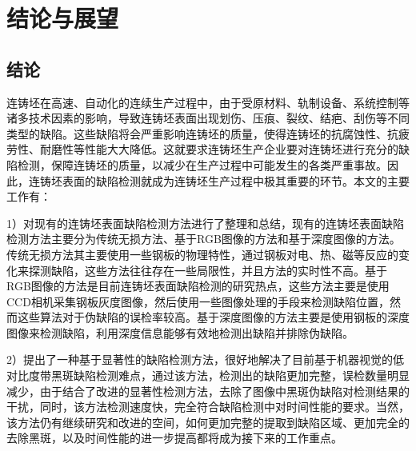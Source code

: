 ﻿%
%
%
%
%
%
\chapter{结论与展望}
    \section{结论}
    连铸坯在高速、自动化的连续生产过程中，由于受原材料、轨制设备、系统控制等诸多技术因素的影响，导致连铸坯表面出现划伤、压痕、裂纹、结疤、刮伤等不同类型的缺陷。这些缺陷将会严重影响连铸坯的质量，使得连铸坯的抗腐蚀性、抗疲劳性、耐磨性等性能大大降低。这就要求连铸坯生产企业要对连铸坯进行充分的缺陷检测，保障连铸坯的质量，以减少在生产过程中可能发生的各类严重事故。因此，连铸坯表面的缺陷检测就成为连铸坯生产过程中极其重要的环节。本文的主要工作有：

    1）对现有的连铸坯表面缺陷检测方法进行了整理和总结，现有的连铸坯表面缺陷检测方法主要分为传统无损方法、基于RGB图像的方法和基于深度图像的方法。传统无损方法其主要使用一些钢板的物理特性，通过钢板对电、热、磁等反应的变化来探测缺陷，这些方法往往存在一些局限性，并且方法的实时性不高。基于RGB图像的方法是目前连铸坯表面缺陷检测的研究热点，这些方法主要是使用CCD相机采集钢板灰度图像，然后使用一些图像处理的手段来检测缺陷位置，然而这些算法对于伪缺陷的误检率较高。基于深度图像的方法主要是使用钢板的深度图像来检测缺陷，利用深度信息能够有效地检测出缺陷并排除伪缺陷。

    2）提出了一种基于显著性的缺陷检测方法，很好地解决了目前基于机器视觉的低对比度带黑斑缺陷检测难点，通过该方法，检测出的缺陷更加完整，误检数量明显减少，由于结合了改进的显著性检测方法，去除了图像中黑斑伪缺陷对检测结果的干扰，同时，该方法检测速度快，完全符合缺陷检测中对时间性能的要求。当然，该方法仍有继续研究和改进的空间，如何更加完整的提取到缺陷区域、更加完全的去除黑斑，以及时间性能的进一步提高都将成为接下来的工作重点。

